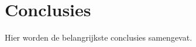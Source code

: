 \chapter{Conclusies}
\label{ch:conclusies}

Hier worden de belangrijkste conclusies samengevat.

\blindtext[2]

\blinditemize

\blindtext

\blindenumerate

\blindtext[2]
